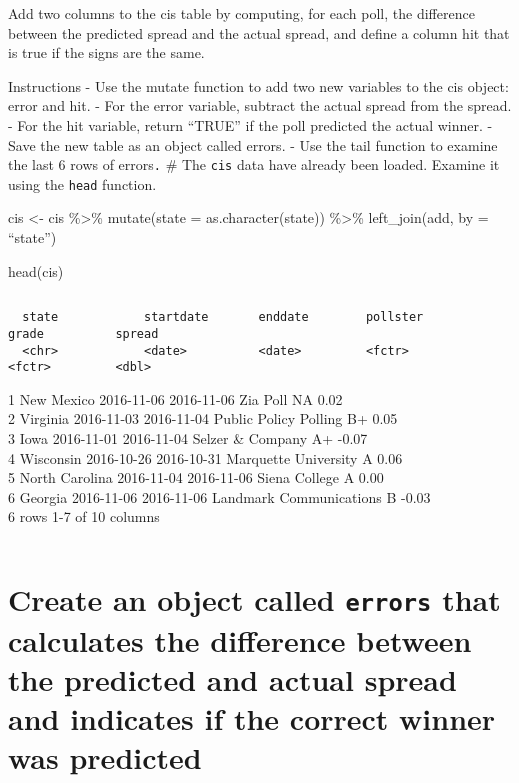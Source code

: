 \documentclass[
]{article}
\begin{document}
Add two columns to the cis table by computing, for each poll, the
difference between the predicted spread and the actual spread, and
define a column hit that is true if the signs are the same.

Instructions - Use the mutate function to add two new variables to the
cis object: error and hit. - For the error variable, subtract the actual
spread from the spread. - For the hit variable, return ``TRUE'' if the
poll predicted the actual winner. - Save the new table as an object
called errors. - Use the tail function to examine the last 6 rows of
errors\texttt{.} \# The \texttt{cis} data have already been loaded.
Examine it using the \texttt{head} function.

cis \textless- cis \%\textgreater\% mutate(state = as.character(state))
\%\textgreater\% left\_join(add, by = ``state'')

head(cis)

\begin{verbatim}
\end{verbatim}

\begin{verbatim}
  state            startdate       enddate        pollster                 grade          spread
  <chr>            <date>          <date>         <fctr>                   <fctr>         <dbl>
\end{verbatim}

1 New Mexico 2016-11-06 2016-11-06 Zia Poll NA 0.02\\
2 Virginia 2016-11-03 2016-11-04 Public Policy Polling B+ 0.05\\
3 Iowa 2016-11-01 2016-11-04 Selzer \& Company A+ -0.07\\
4 Wisconsin 2016-10-26 2016-10-31 Marquette University A 0.06\\
5 North Carolina 2016-11-04 2016-11-06 Siena College A 0.00\\
6 Georgia 2016-11-06 2016-11-06 Landmark Communications B -0.03\\
6 rows \textbar{} 1-7 of 10 columns

\begin{verbatim}
\end{verbatim}

\hypertarget{create-an-object-called-errors-that-calculates-the-difference-between-the-predicted-and-actual-spread-and-indicates-if-the-correct-winner-was-predicted}{%
\section{\texorpdfstring{Create an object called \texttt{errors} that
calculates the difference between the predicted and actual spread and
indicates if the correct winner was
predicted}{Create an object called errors that calculates the difference between the predicted and actual spread and indicates if the correct winner was predicted}}\label{create-an-object-called-errors-that-calculates-the-difference-between-the-predicted-and-actual-spread-and-indicates-if-the-correct-winner-was-predicted}}
\end{document}
